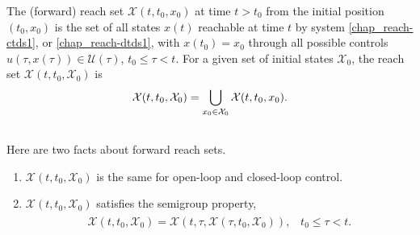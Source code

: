 \documentclass[letterpaper,10pt,english]{sphinxmanual}
\begin{document}
The (forward) reach set ${\mathcal X}(t, t_0, x_0)$ at time
$t>t_0$ from the initial position $(t_0, x_0)$ is the set of
all states $x(t)$ reachable at time $t$ by system \eqref{chap_reach-ctds1},
or \eqref{chap_reach-dtds1}, with $x(t_0)=x_0$ through all possible controls
$u(\tau, x(\tau))\in{\mathcal U}(\tau)$,
$t_0\leqslant\tau< t$. For a given set of initial states
${\mathcal X}_0$, the reach set
${\mathcal X}(t, t_0, {\mathcal X}_0)$ is
\begin{gather}
\begin{split}{\mathcal X}(t, t_0, {\mathcal X}_0) = \bigcup_{x_0\in{\mathcal X}_0}{\mathcal X}(t, t_0, x_0).\end{split}\notag\\\begin{split}\end{split}\notag
\end{gather}
Here are two facts about forward reach sets.
\begin{enumerate}
\item {} 
${\mathcal X}(t, t_0, {\mathcal X}_0)$ is the same for
open-loop and closed-loop control.

\item {} 
${\mathcal X}(t, t_0, {\mathcal X}_0)$ satisfies the semigroup
property,
\label{chap_reach:equation-semigroup}\begin{gather}
\begin{split}{\mathcal X}(t, t_0, {\mathcal X}_0) = {\mathcal X}(t, \tau, {\mathcal X}(\tau, t_0, {\mathcal X}_0)), \;\;\;
t_0\leqslant\tau< t.\end{split}\label{chap_reach-semigroup}
\end{gather}
\end{enumerate}
\end{document}
